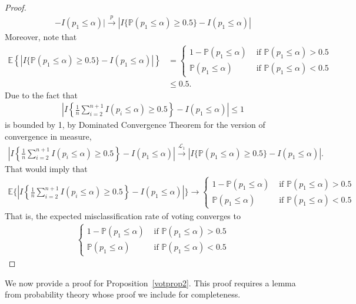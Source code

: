 \documentclass[11pt]{article}
\def\E{\mathbb{E}} %
\def\P{\mathbb{P}}
\theoremstyle{definition}
\begin{document}
\begin{proof}
\begin{align*}
  - I( p_1 \leq  \alpha) \bigg| \stackrel{p}{\rightarrow}   |I\{ \P(p_1 \leq  \alpha) \geq 0.5\}
  - I( p_1 \leq  \alpha) |
\end{align*}
Moreover, note that
\begin{align*}
\E \left\{ |I\{ \P(p_1 \leq  \alpha) \geq 0.5\}
  - I( p_1 \leq  \alpha) |\right\}
  & = \begin{cases}
    1- \P(p_1 \leq \alpha) & \text{ if } \P(p_1 \leq \alpha) > 0.5 \\
    \P(p_1 \leq \alpha) & \text{ if } \P(p_1 \leq \alpha) < 0.5 
  \end{cases} \\
  & \leq  0.5.
\end{align*}
Due to the fact that
\begin{align*}
 \left|I\left\{\frac{1}{n}\sum_{i=2}^{n+1}I(p_i \leq  \alpha) \geq 0.5\right\}
  - I( p_1 \leq  \alpha) \right| \leq 1
\end{align*}
is bounded by 1, by Dominated Convergence Theorem for the version of convergence in measure,
\begin{align*}
 \left|I\left\{\frac{1}{n}\sum_{i=2}^{n+1}I(p_i \leq  \alpha) \geq 0.5\right\}
  - I( p_1 \leq  \alpha) \right|
  \stackrel{\mathcal{L}_1}{\rightarrow}  |I\{ \P(p_1 \leq  \alpha) \geq 0.5\}
  - I( p_1 \leq  \alpha) |.
\end{align*}
That would imply that 
\begin{align*}
  \E \bigg\{\left|I\left\{\frac{1}{n}\sum_{i=2}^{n+1}I(p_i \leq  \alpha) \geq 0.5\right\}
  - I( p_1 \leq  \alpha) \right|\bigg\}
  \to  \begin{cases}
    1- \P(p_1 \leq \alpha) & \text{ if } \P(p_1 \leq \alpha) > 0.5 \\
    \P(p_1 \leq \alpha) & \text{ if } \P(p_1 \leq \alpha) < 0.5 
  \end{cases}
\end{align*}
That is, the expected misclassification rate of voting converges to 
\begin{align*}
  \begin{cases}
    1- \P(p_1 \leq \alpha) & \text{ if } \P(p_1 \leq \alpha) > 0.5 \\
    \P(p_1 \leq \alpha) & \text{ if } \P(p_1 \leq \alpha) < 0.5 
  \end{cases}
\end{align*}
\end{proof}


We now provide a proof for Proposition~\ref{votprop2}. This proof requires a lemma from probability theory whose proof we include for completeness.
\end{document}
